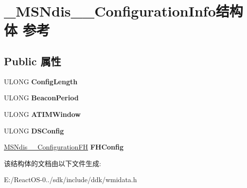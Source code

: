 \hypertarget{struct___m_s_ndis__80211___configuration_info}{}\section{\+\_\+\+M\+S\+Ndis\+\_\+\_\+\+Configuration\+Info结构体 参考}
\label{struct___m_s_ndis__80211___configuration_info}
\subsection*{Public 属性}
\begin{DoxyCompactItemize}
\item 
\mbox{\label{struct___m_s_ndis__80211___configuration_info_a9a07b9ab59449db55165c053fa04a462}} 
U\+L\+O\+NG {\bfseries Config\+Length}
\item 
\mbox{\label{struct___m_s_ndis__80211___configuration_info_a457011bb092d7388a95fc27ec91a6b6c}} 
U\+L\+O\+NG {\bfseries Beacon\+Period}
\item 
\mbox{\label{struct___m_s_ndis__80211___configuration_info_a94afdc12d056322e67e99390936b6346}} 
U\+L\+O\+NG {\bfseries A\+T\+I\+M\+Window}
\item 
\mbox{\label{struct___m_s_ndis__80211___configuration_info_a6dfa926c981da751643137dc14366aee}} 
U\+L\+O\+NG {\bfseries D\+S\+Config}
\item 
\mbox{\label{struct___m_s_ndis__80211___configuration_info_a355b76ab770ae7d8823f6e30254f9b71}} 
\hyperlink{struct___m_s_ndis__80211___configuration_f_h}{M\+S\+Ndis\+\_\+\_\+\+Configuration\+FH} {\bfseries F\+H\+Config}
\end{DoxyCompactItemize}


该结构体的文档由以下文件生成\+:\begin{DoxyCompactItemize}
\item 
E\+:/\+React\+O\+S-\/0../sdk/include/ddk/wmidata.\+h\end{DoxyCompactItemize}
